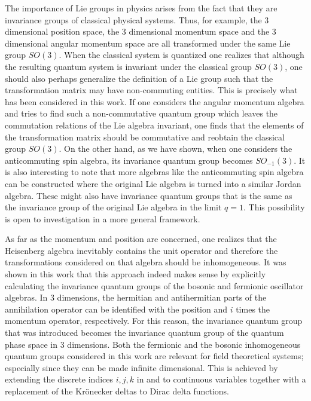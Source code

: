 The importance of Lie groups in physics arises from the fact that
they are invariance groups of classical physical systems. Thus, for
example, the 3 dimensional position space, the 3 dimensional momentum
space and the 3 dimensional angular momentum space are all transformed
under the same Lie group $SO(3)$. When the classical system is
quantized one realizes that although the resulting quantum system
is invariant under the classical group $SO(3)$, one should also 
perhaps generalize the definition of a Lie group such that the
transformation matrix may have non-commuting entities. This is 
precisely what has been considered in this work. If one considers
the angular momentum algebra and tries to find such a non-commutative
quantum group which leaves the commutation relations of the Lie algebra
invariant, one finds that the elements of the transformation matrix
should be commutative and reobtain the classical group $SO(3)$. On the
other hand, as we have shown, when one considers the anticommuting
spin algebra, its invariance quantum group becomes $SO_{-1}(3)$.
It is also interesting to note that more
algebras like the anticommuting spin algebra can be constructed
where the original Lie algebra is turned into a similar Jordan
algebra. These might also have invariance quantum groups that is the
same as the invariance group of the original Lie algebra in the
limit $q=1$. This possibility is open to investigation in a more
general framework.

As far as the momentum and position are concerned, one realizes that
the Heisenberg algebra inevitably contains the unit operator
and therefore the transformations considered on that algebra should 
be inhomogeneous. It was shown
in this work that this approach indeed makes sense by explicitly
calculating the invariance quantum groups of the bosonic and fermionic
oscillator algebras. In 3 dimensions, the hermitian and antihermitian parts
of the annihilation operator can be identified with the position and 
$i$ times the momentum operator, respectively. For this reason, the
invariance quantum group \BISp that was introduced becomes the invariance
quantum group of the quantum phase space in 3 dimensions. Both
the fermionic and the bosonic inhomogeneous quantum groups considered
in this work are relevant for field theoretical systems; especially since
they can be made infinite dimensional. This is achieved by 
extending the discrete indices $i, j, k$ in \BISp and \FIO 
to continuous  variables together with a replacement of 
the Kr\"onecker deltas to Dirac delta functions. 


